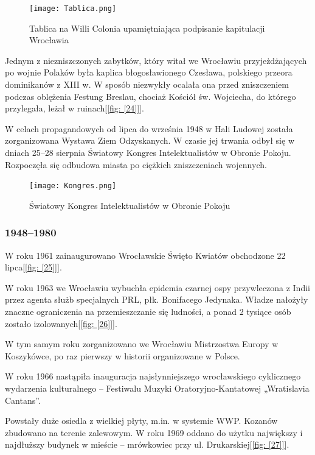 \documentclass{article}
\begin{document}
\begin{center}
\begin{figure}[h]
	\centering
	\texttt{[image: Tablica.png]}
	\caption{Tablica na Willi Colonia upamiętniająca podpisanie kapitulacji Wrocławia}
\end{figure}
\end{center}

Jednym z niezniszczonych zabytków, który witał we Wrocławiu przyjeżdżających po wojnie Polaków była kaplica błogosławionego Czesława, polskiego przeora dominikanów z XIII w. W sposób niezwykły ocalała ona przed zniszczeniem podczas oblężenia Festung Breslau, chociaż Kościół św. Wojciecha, do którego przylegała, leżał w ruinach[\ref{fig: [24]}].

W celach propagandowych od lipca do września 1948 w Hali Ludowej została zorganizowana Wystawa Ziem Odzyskanych. W czasie jej trwania odbył się w dniach 25–28 sierpnia Światowy Kongres Intelektualistów w Obronie Pokoju. Rozpoczęła się odbudowa miasta po ciężkich zniszczeniach wojennych.

\begin{center}
\begin{figure}[h]
	\centering
	\texttt{[image: Kongres.png]}
	\caption{Światowy Kongres Intelektualistów w Obronie Pokoju}
\end{figure}
\end{center}


\subsubsection {1948–1980}

W roku 1961 zainaugurowano Wrocławskie Święto Kwiatów obchodzone 22 lipca[\ref{fig: [25]}].

W roku 1963 we Wrocławiu wybuchła epidemia czarnej ospy przywleczona z Indii przez agenta służb specjalnych PRL, płk. Bonifacego Jedynaka. Władze nałożyły znaczne ograniczenia na przemieszczanie się ludności, a ponad 2 tysiące osób zostało izolowanych[\ref{fig: [26]}].

W tym samym roku zorganizowano we Wrocławiu Mistrzostwa Europy w Koszykówce, po raz pierwszy w historii organizowane w Polsce.

W roku 1966 nastąpiła inauguracja najsłynniejszego wrocławskiego cyklicznego wydarzenia kulturalnego – Festiwalu Muzyki Oratoryjno-Kantatowej „Wratislavia Cantans”.

Powstały duże osiedla z wielkiej płyty, m.in. w systemie WWP. Kozanów zbudowano na terenie zalewowym. W roku 1969 oddano do użytku największy i najdłuższy budynek w mieście – mrówkowiec przy ul. Drukarskiej[\ref{fig: [27]}].
\end{document}
